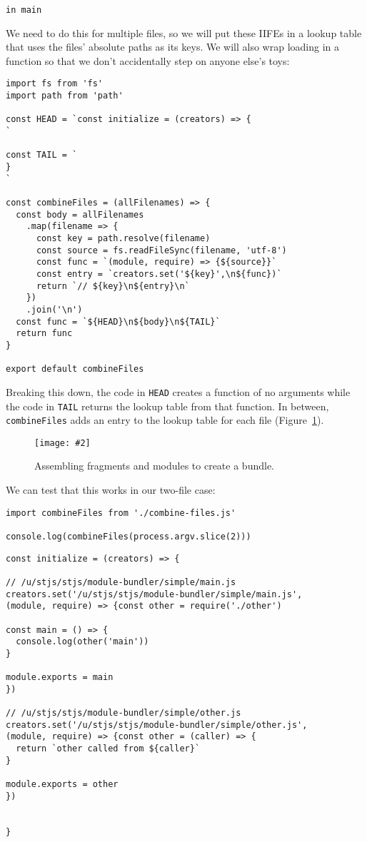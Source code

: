 \documentclass[krantzl]{krantz}
\newcommand{\figpdf}[4]{\begin{figure}%
\centering%
\texttt{[image: \#2]}%
\caption{#3}%
\label{#1}%
\end{figure}}
\newcommand{\figref}[1]{Figure~\ref{#1}}
\begin{document}
\begin{lstlisting}[frame=tblr,backgroundcolor=\color{black!5}]
in main
\end{lstlisting}



We need to do this for multiple files,
so we will put these IIFEs in a lookup table
that uses the files’ absolute paths as its keys.
We will also wrap loading in a function
so that we don’t accidentally step on anyone else’s toys:


\begin{lstlisting}[frame=tblr]
import fs from 'fs'
import path from 'path'

const HEAD = `const initialize = (creators) => {
`

const TAIL = `
}
`

const combineFiles = (allFilenames) => {
  const body = allFilenames
    .map(filename => {
      const key = path.resolve(filename)
      const source = fs.readFileSync(filename, 'utf-8')
      const func = `(module, require) => {${source}}`
      const entry = `creators.set('${key}',\n${func})`
      return `// ${key}\n${entry}\n`
    })
    .join('\n')
  const func = `${HEAD}\n${body}\n${TAIL}`
  return func
}

export default combineFiles
\end{lstlisting}



Breaking this down,
the code in \texttt{HEAD} creates a function of no arguments
while the code in \texttt{TAIL} returns the lookup table from that function.
In between,
\texttt{combineFiles} adds an entry to the lookup table for each file
(\figref{module-bundler-head-tail}).

\figpdf{module-bundler-head-tail}{./module-bundler/head-tail.pdf}{Assembling fragments and modules to create a bundle.}{0.6}


We can test that this works in our two-file case:


\begin{lstlisting}[frame=tblr]
import combineFiles from './combine-files.js'

console.log(combineFiles(process.argv.slice(2)))
\end{lstlisting}



\begin{lstlisting}[frame=tblr]
const initialize = (creators) => {

// /u/stjs/stjs/module-bundler/simple/main.js
creators.set('/u/stjs/stjs/module-bundler/simple/main.js',
(module, require) => {const other = require('./other')

const main = () => {
  console.log(other('main'))
}

module.exports = main
})

// /u/stjs/stjs/module-bundler/simple/other.js
creators.set('/u/stjs/stjs/module-bundler/simple/other.js',
(module, require) => {const other = (caller) => {
  return `other called from ${caller}`
}

module.exports = other
})


}
\end{lstlisting}
\end{document}
